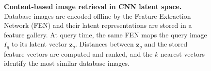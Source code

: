 \begin{figure}[htbp]
\caption{\textbf{Content-based image retrieval in CNN latent space.} Database images are encoded offline by the Feature Extraction Network (FEN) and their latent representations are stored in a feature gallery. At query time, the same FEN maps the query image $I_q$ to its latent vector $\mathbf{z}_q$. Distances between $\mathbf{z}_q$ and the stored feature vectors are computed and ranked, and the $k$ nearest vectors identify the most similar database images.}
\label{fig:content-based-image-retrieval}
\end{figure}